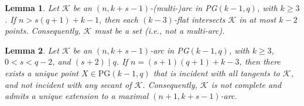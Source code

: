 \documentclass[10pt,a4paper]{amsart}
\newtheorem{lemma}{Lemma}
\newcommand{\K}{\mathcal{K}}
\begin{document}
\begin{lemma}\label{lem: long implies projective and cap}
	Let \( \K \) be an \((n, k+s-1)\)-(multi-)arc in PG\((k-1, q)\), with \( k \ge 3 \). If \( n > s(q+1) + k - 1 \), then each $(k-3)$-flat intersects $\K$ in at most $k-2$ points. Consequently,  \( \K \) must be a set (i.e., not a multi-arc).
\end{lemma}

\begin{lemma}\label{lem: main result}
	Let \( \K \) be an \((n, k + s - 1)\)-arc in PG\((k - 1, q)\), with \( k \ge 3 \), \( 0 < s < q - 2 \), and \( (s+2) \mid q \). If \( n = (s+1)(q+1) + k - 3 \), then there exists a unique point \( X \in \text{PG}(k - 1, q) \) that is incident with all tangents to \( \K \), and not incident with any secant of \( \K \). Consequently, \( \K \) is not complete and admits a unique extension to a maximal \((n + 1, k + s - 1)\)-arc.
\end{lemma}
\end{document}
